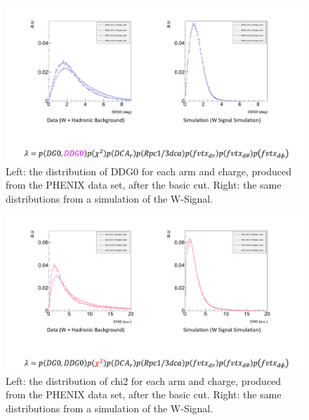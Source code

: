 \begin{figure}
  \centering
  \includegraphics[width=\linewidth,trim=4 4 4 4,clip]{./figures/pdf_DDG0.png}
  \caption{
    Left: the distribution of DDG0 for each arm and charge, produced from the
    PHENIX data set, after the basic cut. Right: the same distributions from a
    simulation of the W-Signal.
  }
  \label{fig:pdf_DDG0}
\end{figure}

\begin{figure}
  \centering
  \includegraphics[width=\linewidth,trim=4 4 4 4,clip]{./figures/pdf_chi2.png}
  \caption{
    Left: the distribution of chi2 for each arm and charge, produced from the
    PHENIX data set, after the basic cut. Right: the same distributions from a
    simulation of the W-Signal.
  }
  \label{fig:pdf_chi2}
\end{figure}

